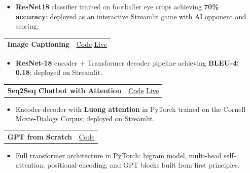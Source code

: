 \documentclass[10.5pt, a4paper]{article}
\makeatletter
\newcommand{\proj}[3]{%
  \vspace{1pt}%
  \begin{tabularx}{\linewidth}{@{}X r@{}}
    \textbf{#1}\enspace{\small\color{mid}\textit{#2}} & {\small #3}
  \end{tabularx}\vspace{0pt}}
\makeatother
\begin{document}
\begin{itemize}
  \item \textbf{ResNet18} classifier trained on footballer eye crops achieving \textbf{70\% accuracy};
        deployed as an interactive Streamlit game with AI opponent and scoring.
\end{itemize}

\vspace{4pt}

\proj{Image Captioning}
     {--- Computer Vision}
     {\href{https://github.com/paudelsamir/365DaysOfData/tree/main/10-Projects-Based-ML-DL/03-Image-Captioning}{Code}
      \enspace\textbar\enspace
      \href{https://image-captioning-samir.streamlit.app}{Live}}

\begin{itemize}
  \item \textbf{ResNet-18} encoder + Transformer decoder pipeline achieving \textbf{BLEU-4: 0.18};
        deployed on Streamlit.
\end{itemize}

\vspace{4pt}

\proj{Seq2Seq Chatbot with Attention}
     {--- Seq2Seq NLP}
     {\href{https://github.com/paudelsamir/365DaysOfData/tree/main/10-Projects-Based-ML-DL/02-Natural-Language-Processing/seq2seq-charbot}{Code}
      \enspace\textbar\enspace
      \href{https://seq2seq-chatbot-samir.streamlit.app}{Live}}

\begin{itemize}
  \item Encoder-decoder with \textbf{Luong attention} in PyTorch trained on the
        Cornell Movie-Dialogs Corpus; deployed on Streamlit.
\end{itemize}

\vspace{4pt}

\proj{GPT from Scratch}
     {--- LLM Foundations}
     {\href{https://github.com/paudelsamir/365DaysOfData/tree/main/11-Foundations-Of-LLMS/GPT-From-Scratch}{Code}}

\begin{itemize}
  \item Full transformer architecture in PyTorch: bigram model, multi-head self-attention,
        positional encoding, and GPT blocks built from first principles.
\end{itemize}
\end{document}

